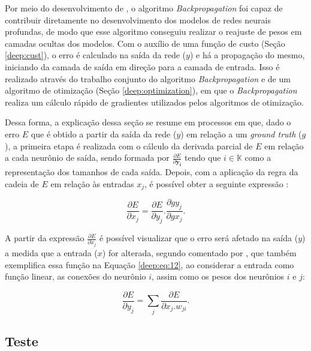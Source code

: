 Por meio do desenvolvimento de \cite{rumelhart1986learning}, o algoritmo \textit{Backpropagation} foi capaz de contribuir diretamente no desenvolvimento dos modelos de redes neurais profundas, de modo que esse algoritmo conseguiu realizar o reajuste de pesos em camadas ocultas dos modelos. Com o auxílio de uma função de custo (Seção
\ref{deep:cust}), o erro é calculado na saída da rede ($y$) e há a propagação do mesmo, iniciando da camada de saída em direção para a camada de entrada. Isso é realizado através do trabalho conjunto do algoritmo \textit{Backpropagation} e de um algoritmo de otimização (Seção \ref{deep:optimization}), em que o \textit{Backpropagation} realiza um cálculo rápido de gradientes utilizados pelos algoritmos de otimização.

Dessa forma, a explicação dessa seção se resume em processos em que, dado o erro $E$ que é obtido a partir da saída da rede ($y$) em relação a um \textit{ground truth} ($g$), a primeira etapa é realizada com o cálculo da derivada parcial de $E$ em relação a cada neurônio de saída, sendo formada por $\frac{\partial E}{\partial \boldsymbol{y_i}}$ tendo que $i \in \mathbb{K}$ como a representação dos tamanhos de cada saída. Depois, com a aplicação da regra da cadeia de $E$ em relação às entradas $x_j$, é possível obter a seguinte expressão \cite{rumelhart1986learning}:

\begin{equation}
    \label{deep:eq:11}
    \frac{\partial E}{\partial x_j} = \frac{\partial E}{\partial y_j} . \frac{\partial g y_j}{\partial g x_j}.
\end{equation}

A partir da expressão $\frac{\partial E}{\partial x_j}$ é possível visualizar que o erro será afetado na saída ($y$) a medida que a entrada ($x$) for alterada, segundo comentado por \cite{rumelhart1986learning}, que também exemplifica essa função na Equação \ref{deep:eq:12}, ao considerar a entrada como função linear, as conexões do neurônio $i$, assim como os pesos dos neurônios $i$ e $j$:

\begin{equation}
    \label{deep:eq:12}
    \frac{\partial E}{\partial y_j} = \sum_j \frac{\partial E}{\partial x_j . w_{ji}}.
\end{equation}


\subsection{Teste}
\label{deep:test}

